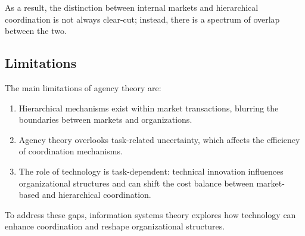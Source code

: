 As a result, the distinction between internal markets and hierarchical coordination is not always clear-cut; instead, there is a spectrum of overlap between the two.

\subsection{Limitations}
The main limitations of agency theory are: 
\begin{enumerate}
    \item Hierarchical mechanisms exist within market transactions, blurring the boundaries between markets and organizations.
    \item Agency theory overlooks task-related uncertainty, which affects the efficiency of coordination mechanisms.
    \item The role of technology is task-dependent: technical innovation influences organizational structures and can shift the cost balance between market-based and hierarchical coordination.
\end{enumerate}
\noindent To address these gaps, information systems theory explores how technology can enhance coordination and reshape organizational structures.
